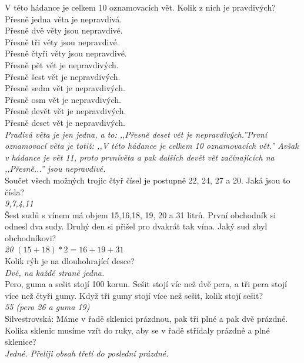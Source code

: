 \begin{multicols}{2}
\noindent
V této hádance je celkem 10 oznamovacích vět. Kolik z nich 
je pravdivých?\\
Přesně jedna věta je nepravdivá.\\
Přesně dvě věty jsou nepravdivé.\\
Přesně tři věty jsou nepravdivé.\\
Přesně čtyři věty jsou nepravdivé.\\
Přesně pět vět je nepravdivých.\\
Přesně šest vět je nepravdivých.\\
Přesně sedm vět je nepravdivých.\\
Přesně osm vět je nepravdivých.\\
Přesně devět vět je nepravdivých.\\
Přesně deset vět je nepravdivých.\\[1 mm]
{\sl Pradivá věta je jen jedna, a to: ,,Přesně deset vět je
nepravdivých.''První oznamovací věta je totiž: ,,V této hádance
je celkem 10 oznamovacích vět.'' Avšak v hádance je vět 11,
proto prvnívěta a pak dalších devět vět začínajících na ,,Přesně...''
jsou nepravdivé.}\\

\noindent
Součet všech možných trojic čtyř čísel je postupně 22, 24, 
27 a 20. Jaká jsou to čísla?\\[1 mm]
{\sl 9,7,4,11}\\

\noindent
Šest sudů s vínem má objem 15,16,18, 19, 20 a 31 litrů. První 
obchodník si odnesl dva sudy. Druhý den si přišel pro dvakrát 
tak vína. Jaký sud zbyl obchodníkovi?\\[1 mm]
{\sl 20 $(15+18)*2=16+19+31$}\\

\noindent
Kolik rýh je na dlouhohrající desce?\\[1 mm]
{\sl Dvě, na každé straně jedna.}\\

\noindent
Pero, guma a sešit stojí 100 korun. Sešit stojí víc než dvě 
pera, a tři pera stojí více než čtyři gumy. Když tři gumy stojí 
více než sešit, kolik stojí sešit?\\[1 mm]
{\sl 55 (pero 26 a guma 19)}\\

\noindent
Silvestrovská: Máme v řadě sklenici prázdnou, pak tři plné 
a pak dvě prázdné. Kolika sklenic musíme vzít do ruky, aby se 
v řadě střídaly prázdné a plné sklenice?\\[1 mm]
{\sl Jedné. Přeliji obsah třetí do poslední prázdné.}\\


\end{multicols}
